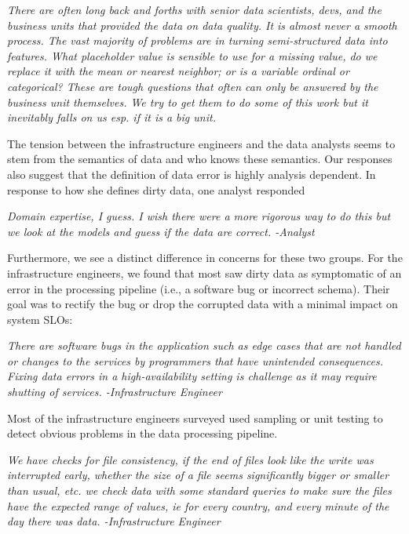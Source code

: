 \vspace{0.5em}
\emph{There are often long back and forths with senior data scientists, devs, and the business units that provided the data on data quality. It is almost never a smooth process. The vast majority of problems are in turning semi-structured data into features. What placeholder value is sensible to use for a missing value, do we replace it with the mean or nearest neighbor; or is a variable ordinal or categorical? These are tough questions that often can only be answered by the business unit themselves. We try to get them to do some of this work but it inevitably falls on us esp. if it is a big unit.}

\vspace{0.5em}

The tension between the infrastructure engineers and the data analysts seems to stem from the semantics of data and who knows these semantics. Our responses also suggest that the definition of data error is highly analysis dependent. In response to how she defines dirty data, one analyst responded

\vspace{0.5em}
\emph{Domain expertise, I guess. I wish there were a more rigorous way to do this but we look at the models and guess if the data are correct. -Analyst}



Furthermore, we see a distinct difference in concerns for these two groups. For the infrastructure engineers, we found that most saw dirty data as symptomatic of an error in the processing pipeline (i.e., a software bug or incorrect schema). Their goal was to rectify the bug or drop the corrupted data with a minimal impact on system SLOs:

\vspace{0.5em}
\emph{There are software bugs in the application such as edge cases that are not handled or changes to the services by programmers that have unintended consequences. Fixing data errors in a high-availability setting is challenge as it may require shutting of services. -Infrastructure Engineer}

\vspace{0.5em}

Most of the infrastructure engineers surveyed used sampling or unit testing to detect obvious problems in the data processing pipeline.

\vspace{0.5em}
\emph{We have checks for file consistency, if the end of files look like the write was interrupted early, whether the size of a file seems significantly bigger or smaller than usual, etc. we check data with some standard queries to make sure the files have the expected range of values, ie for every country, and every minute of the day there was data. -Infrastructure Engineer}

